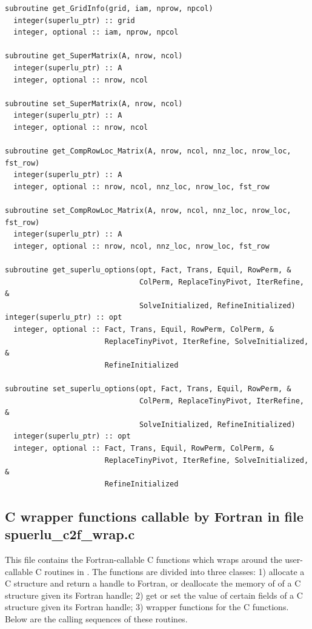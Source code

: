 \begin{verbatim}
subroutine get_GridInfo(grid, iam, nprow, npcol)
  integer(superlu_ptr) :: grid
  integer, optional :: iam, nprow, npcol

subroutine get_SuperMatrix(A, nrow, ncol)
  integer(superlu_ptr) :: A
  integer, optional :: nrow, ncol

subroutine set_SuperMatrix(A, nrow, ncol)
  integer(superlu_ptr) :: A
  integer, optional :: nrow, ncol

subroutine get_CompRowLoc_Matrix(A, nrow, ncol, nnz_loc, nrow_loc, fst_row)
  integer(superlu_ptr) :: A
  integer, optional :: nrow, ncol, nnz_loc, nrow_loc, fst_row

subroutine set_CompRowLoc_Matrix(A, nrow, ncol, nnz_loc, nrow_loc, fst_row)
  integer(superlu_ptr) :: A
  integer, optional :: nrow, ncol, nnz_loc, nrow_loc, fst_row

subroutine get_superlu_options(opt, Fact, Trans, Equil, RowPerm, &
                               ColPerm, ReplaceTinyPivot, IterRefine, &
                               SolveInitialized, RefineInitialized)
integer(superlu_ptr) :: opt
  integer, optional :: Fact, Trans, Equil, RowPerm, ColPerm, &
                       ReplaceTinyPivot, IterRefine, SolveInitialized, &
                       RefineInitialized

subroutine set_superlu_options(opt, Fact, Trans, Equil, RowPerm, &
                               ColPerm, ReplaceTinyPivot, IterRefine, &
                               SolveInitialized, RefineInitialized)
  integer(superlu_ptr) :: opt
  integer, optional :: Fact, Trans, Equil, RowPerm, ColPerm, &
                       ReplaceTinyPivot, IterRefine, SolveInitialized, &
                       RefineInitialized
\end{verbatim}


\subsection{C wrapper functions callable by Fortran in file
            \textsf{spuerlu\_c2f\_wrap.c}}
This file contains the Fortran-callable C functions which wraps around
the user-callable C routines in {\superlud}. The functions are divided
into three classes:
1) allocate a C structure and return a handle to Fortran,
or deallocate the memory of of a C structure given its Fortran handle;
2) get or set the value of certain fields of a C structure given its
Fortran handle;
3) wrapper functions for the {\superlud} C functions.
Below are the calling sequences of these routines.

